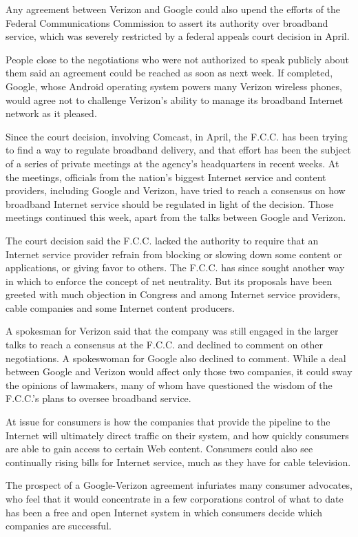 ﻿\documentclass[12pt]{article}
\begin{document}
Any agreement between Verizon and Google could also upend the efforts of the Federal Communications
Commission to assert its authority over broadband service, which was severely restricted by a
federal appeals court decision in April.

People close to the negotiations who were not authorized to speak publicly about them said an
agreement could be reached as soon as next week. If completed, Google, whose Android operating
system powers many Verizon wireless phones, would agree not to challenge Verizon's ability to manage
its broadband Internet network as it pleased.

Since the court decision, involving Comcast, in April, the F.C.C. has been trying to find a way to
regulate broadband delivery, and that effort has been the subject of a series of private meetings at
the agency's headquarters in recent weeks. At the meetings, officials from the nation's biggest
Internet service and content providers, including Google and Verizon, have tried to reach a
consensus on how broadband Internet service should be regulated in light of the decision. Those
meetings continued this week, apart from the talks between Google and Verizon.

The court decision said the F.C.C. lacked the authority to require that an Internet service provider
refrain from blocking or slowing down some content or applications, or giving favor to others. The
F.C.C. has since sought another way in which to enforce the concept of net neutrality. But its
proposals have been greeted with much objection in Congress and among Internet service providers,
cable companies and some Internet content producers.

A spokesman for Verizon said that the company was still engaged in the larger talks to reach a
consensus at the F.C.C. and declined to comment on other negotiations. A spokeswoman for Google also
declined to comment. While a deal between Google and Verizon would affect only those two companies,
it could sway the opinions of lawmakers, many of whom have questioned the wisdom of the F.C.C.'s
plans to oversee broadband service.

At issue for consumers is how the companies that provide the pipeline to the Internet will
ultimately direct traffic on their system, and how quickly consumers are able to gain access to
certain Web content. Consumers could also see continually rising bills for Internet service, much as
they have for cable television.

The prospect of a Google-Verizon agreement infuriates many consumer advocates, who feel that it
would concentrate in a few corporations control of what to date has been a free and open Internet
system in which consumers decide which companies are successful.
\end{document}
